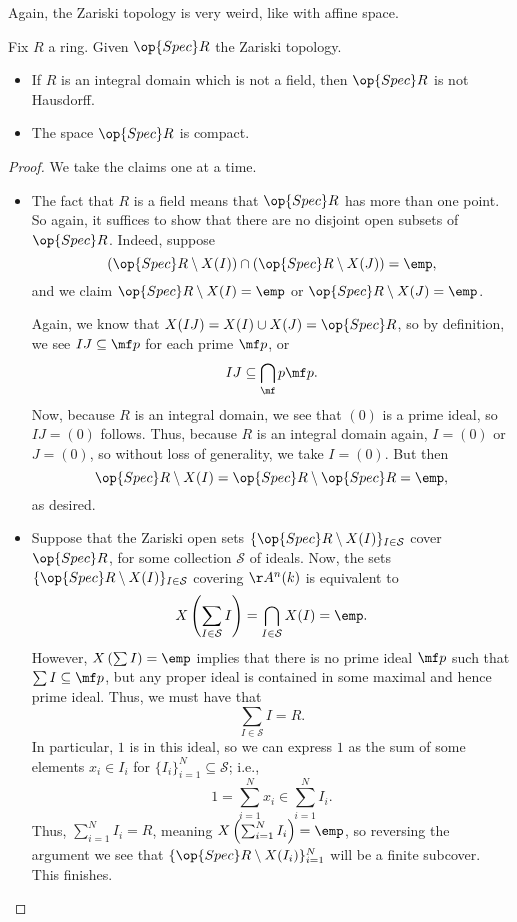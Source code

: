 Again, the Zariski topology is very weird, like with affine space.
\begin{proposition}
	Fix $R$ a ring. Given $\op{Spec}R$ the Zariski topology.
	\begin{itemize}
		\item If $R$ is an integral domain which is not a field, then $\op{Spec}R$ is not Hausdorff.
		\item The space $\op{Spec}R$ is compact.
	\end{itemize}
\end{proposition}
\begin{proof}
	We take the claims one at a time.
	\begin{itemize}
		\item The fact that $R$ is a field means that $\op{Spec}R$ has more than one point. So again, it suffices to show that there are no disjoint open subsets of $\op{Spec}R$. Indeed, suppose
		\[(\op{Spec}R\setminus X(I))\cap(\op{Spec}R\setminus X(J))=\emp,\]
		and we claim $\op{Spec}R\setminus X(I)=\emp$ or $\op{Spec}R\setminus X(J)=\emp$.

		Again, we know that $X(IJ)=X(I)\cup X(J)=\op{Spec}R$, so by definition, we see $IJ\subseteq\mf p$ for each prime $\mf p$, or
		\[IJ\subseteq\bigcap_\mf p\mf p.\]
		Now, because $R$ is an integral domain, we see that $(0)$ is a prime ideal, so $IJ=(0)$ follows. Thus, because $R$ is an integral domain again, $I=(0)$ or $J=(0)$, so without loss of generality, we take $I=(0)$. But then
		\[\op{Spec}R\setminus X(I)=\op{Spec}R\setminus\op{Spec}R=\emp,\]
		as desired.

		\item Suppose that the Zariski open sets $\{\op{Spec}R\setminus X(I)\}_{I\in\mathcal S}$ cover $\op{Spec}R$, for some collection $\mathcal S$ of ideals. Now, the sets $\{\op{Spec}R\setminus X(I)\}_{I\in\mathcal S}$ covering $\AA^n(k)$ is equivalent to
		\[X\left(\sum_{I\in\mathcal S}I\right)=\bigcap_{I\in\mathcal S}X(I)=\emp.\]
		However, $X\left(\sum I\right)=\emp$ implies that there is no prime ideal $\mf p$ such that $\sum I\subseteq\mf p$, but any proper ideal is contained in some maximal and hence prime ideal. Thus, we must have that
		\[\sum_{I\in\mathcal S}I=R.\]
		In particular, $1$ is in this ideal, so we can express $1$ as the sum of some elements $x_i\in I_i$ for $\{I_i\}_{i=1}^N\subseteq\mathcal S$; i.e.,
		\[1=\sum_{i=1}^Nx_i\in\sum_{i=1}^NI_i.\]
		Thus, $\sum_{i=1}^NI_i=R$, meaning $X\left(\sum_{i=1}^NI_i\right)=\emp$, so reversing the argument we see that $\{\op{Spec}R\setminus X(I_i)\}_{i=1}^N$ will be a finite subcover. This finishes.
		\qedhere
	\end{itemize}
\end{proof}

